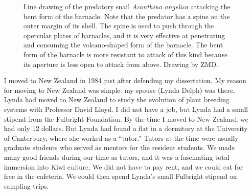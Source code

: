 \documentclass[
  letterpaper,
]{book}
\begin{document}
\begin{figure}


\caption[Line drawing of the predatory snail \emph{Acanthina angelica}
attacking the bent form of the barnacle]{\label{fig-3-3}Line drawing of
the predatory snail \emph{Acanthina angelica} attacking the bent form of
the barnacle. Note that the predator has a spine on the outer margin of
its shell. The spine is used to push through the opercular plates of
barnacles, and it is very effective at penetrating and consuming the
volcano-shaped form of the barnacle. The bent form of the barnacle is
more resistant to attack of this kind because its aperture is less open
to attack from above. Drawing by ZMD.}

\end{figure}%

I moved to New Zealand in 1984 just after defending my dissertation. My
reason for moving to New Zealand was simple: my spouse (Lynda Delph) was
there. Lynda had moved to New Zealand to study the evolution of plant
breeding systems with Professor David Lloyd. I did not have a job, but
Lynda had a small stipend from the Fulbright Foundation. By the time I
moved to New Zealand, we had only 12 dollars. But Lynda had found a flat
in a dormitory at the University of Canterbury, where she worked as a
``tutor.'' Tutors at the time were usually graduate students who served
as mentors for the resident students. We made many good friends during
our time as tutors, and it was a fascinating total immersion into Kiwi
culture. We did not have to pay rent, and we could eat for free in the
cafeteria. We could then spend Lynda's small Fulbright stipend on
sampling trips.
\end{document}
